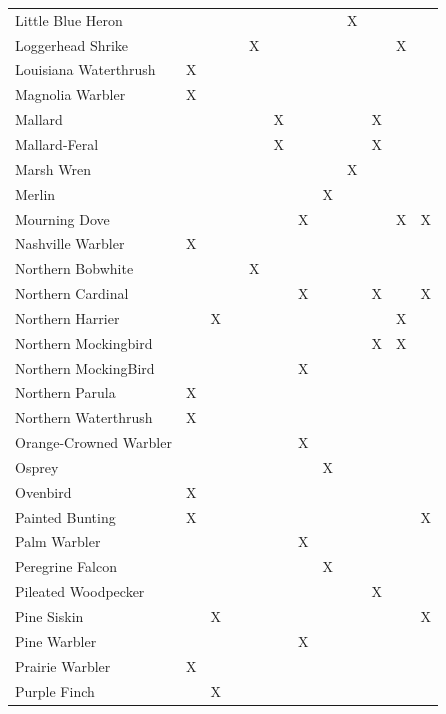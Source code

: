 \documentclass[]{article}
\begin{document}
\begin{longtable}{llllllllllll}
Little Blue Heron &  &  &  &  &  &  &  & X &  &  & \\
Loggerhead Shrike &  &  &  & X &  &  &  &  &  & X & \\
\addlinespace
Louisiana Waterthrush & X &  &  &  &  &  &  &  &  &  & \\
Magnolia Warbler & X &  &  &  &  &  &  &  &  &  & \\
Mallard &  &  &  &  & X &  &  &  & X &  & \\
Mallard-Feral &  &  &  &  & X &  &  &  & X &  & \\
Marsh Wren &  &  &  &  &  &  &  & X &  &  & \\
\addlinespace
Merlin &  &  &  &  &  &  & X &  &  &  & \\
Mourning Dove &  &  &  &  &  & X &  &  &  & X & X\\
Nashville Warbler & X &  &  &  &  &  &  &  &  &  & \\
Northern Bobwhite &  &  &  & X &  &  &  &  &  &  & \\
Northern Cardinal &  &  &  &  &  & X &  &  & X &  & X\\
\addlinespace
Northern Harrier &  & X &  &  &  &  &  &  &  & X & \\
Northern Mockingbird &  &  &  &  &  &  &  &  & X & X & \\
Northern MockingBird &  &  &  &  &  & X &  &  &  &  & \\
Northern Parula & X &  &  &  &  &  &  &  &  &  & \\
Northern Waterthrush & X &  &  &  &  &  &  &  &  &  & \\
\addlinespace
Orange-Crowned Warbler &  &  &  &  &  & X &  &  &  &  & \\
Osprey &  &  &  &  &  &  & X &  &  &  & \\
Ovenbird & X &  &  &  &  &  &  &  &  &  & \\
Painted Bunting & X &  &  &  &  &  &  &  &  &  & X\\
Palm Warbler &  &  &  &  &  & X &  &  &  &  & \\
\addlinespace
Peregrine Falcon &  &  &  &  &  &  & X &  &  &  & \\
Pileated Woodpecker &  &  &  &  &  &  &  &  & X &  & \\
Pine Siskin &  & X &  &  &  &  &  &  &  &  & X\\
Pine Warbler &  &  &  &  &  & X &  &  &  &  & \\
Prairie Warbler & X &  &  &  &  &  &  &  &  &  & \\
\addlinespace
Purple Finch &  & X &  &  &  &  &  &  &  &  & \\

\end{longtable}
\end{document}
